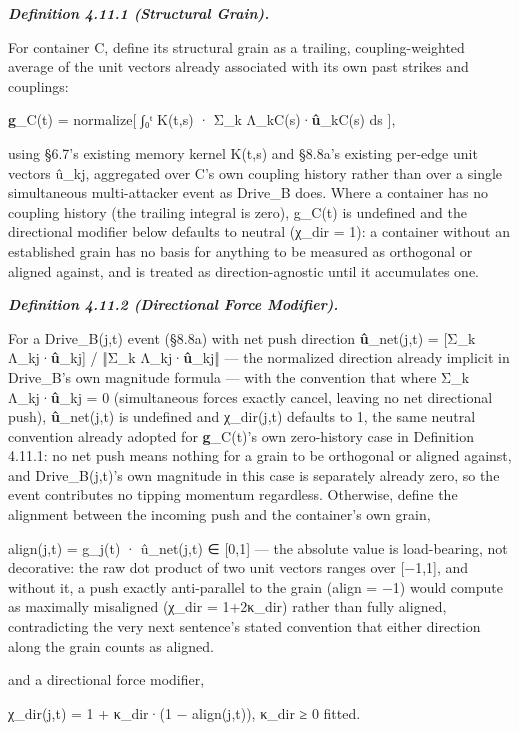 \documentclass[
]{article}
\begin{document}
\emph{\textbf{Definition 4.11.1 (Structural Grain).}}

For container C, define its structural grain as a trailing,
coupling-weighted average of the unit vectors already associated with
its own past strikes and couplings:

\textbf{g}\_C(t) = normalize{[} ∫₀ᵗ K(t,s) · Σ\_k
Λ\_kC(s)·\textbf{û}\_kC(s) ds {]},

using §6.7's existing memory kernel K(t,s) and §8.8a's existing per-edge
unit vectors û\_kj, aggregated over C's own coupling history rather than
over a single simultaneous multi-attacker event as Drive\_B does. Where
a container has no coupling history (the trailing integral is zero),
g\_C(t) is undefined and the directional modifier below defaults to
neutral (χ\_dir = 1): a container without an established grain has no
basis for anything to be measured as orthogonal or aligned against, and
is treated as direction-agnostic until it accumulates one.

\emph{\textbf{Definition 4.11.2 (Directional Force Modifier).}}

For a Drive\_B(j,t) event (§8.8a) with net push direction
\textbf{û}\_net(j,t) = {[}Σ\_k Λ\_kj·\textbf{û}\_kj{]} / ‖Σ\_k
Λ\_kj·\textbf{û}\_kj‖ --- the normalized direction already implicit in
Drive\_B's own magnitude formula --- with the convention that where Σ\_k
Λ\_kj·\textbf{û}\_kj = 0 (simultaneous forces exactly cancel, leaving no
net directional push), \textbf{û}\_net(j,t) is undefined and χ\_dir(j,t)
defaults to 1, the same neutral convention already adopted for
\textbf{g}\_C(t)'s own zero-history case in Definition 4.11.1: no net
push means nothing for a grain to be orthogonal or aligned against, and
Drive\_B(j,t)'s own magnitude in this case is separately already zero,
so the event contributes no tipping momentum regardless. Otherwise,
define the alignment between the incoming push and the container's own
grain,

align(j,t) = \textbar g\_j(t) · û\_net(j,t)\textbar{} ∈ {[}0,1{]} ---
the absolute value is load-bearing, not decorative: the raw dot product
of two unit vectors ranges over {[}−1,1{]}, and without it, a push
exactly anti-parallel to the grain (align = −1) would compute as
maximally misaligned (χ\_dir = 1+2κ\_dir) rather than fully aligned,
contradicting the very next sentence's stated convention that either
direction along the grain counts as aligned.

and a directional force modifier,

χ\_dir(j,t) = 1 + κ\_dir·(1 − align(j,t)), κ\_dir ≥ 0 fitted.
\end{document}
